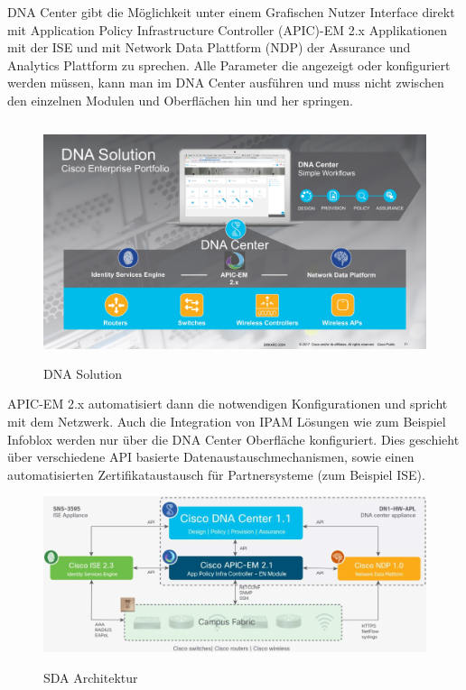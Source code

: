 DNA Center gibt die Möglichkeit unter einem Grafischen Nutzer Interface direkt mit Application Policy Infrastructure Controller (APIC)-EM 2.x Applikationen mit der ISE und mit Network Data Plattform (NDP) der Assurance und Analytics Plattform zu sprechen. Alle Parameter die angezeigt oder konfiguriert werden müssen, kann man im DNA Center ausführen und muss nicht zwischen den einzelnen Modulen und Oberflächen hin und her springen.
\begin{figure}[H]
	\centering
	\includegraphics[height=7cm]{img/DNAC-1.jpg}
	\caption{DNA Solution \cite{cisco-blog-wasistdnacenter}}
	\label{fig:Aufbau einer DNA Solution}
\end{figure}
APIC-EM 2.x automatisiert dann die notwendigen Konfigurationen und spricht mit dem Netzwerk. Auch die Integration von IPAM Lösungen wie zum Beispiel Infoblox werden nur über die DNA Center Oberfläche konfiguriert. Dies geschieht über verschiedene API basierte Datenaustauschmechanismen, sowie einen automatisierten Zertifikataustausch für Partnersysteme (zum Beispiel ISE). \cite{sda-whitepaper} \\

\begin{figure}[H]
	\centering
	\includegraphics[width=1\linewidth]{img/ControllerLayer.png}\\[1px]
	\caption{SDA Architektur \cite{sda-whitepaper} }
	\label{fig:SDA Architektur}
\end{figure}

